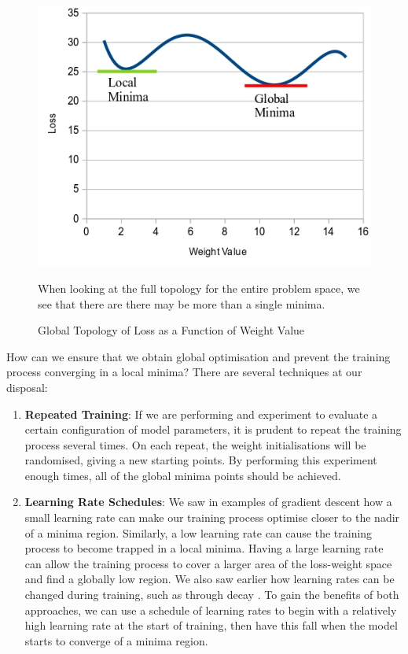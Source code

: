 \begin{figure}[h]
	\centering
	\includegraphics[scale=0.45]{Figures/loss_minima_maxima.jpg}
	\caption{Global Topology of Loss as a Function of Weight Value} {When looking at the full topology for the entire problem space, we see that there are there may be more than a single minima. }
	\label{fig:minima_maxima}
\end{figure}

\noindent
How can we ensure that we obtain global optimisation and prevent the training process converging in a local minima? There are several techniques at our disposal:

\begin{enumerate}
    \item \textbf{Repeated Training}: If we are performing and experiment to evaluate a certain configuration of model parameters, it is prudent to repeat the training process several times. On each repeat, the weight initialisations will be randomised, giving a new starting points. By performing this experiment enough times, all of the global minima points should be achieved.
    
    \item \textbf{Learning Rate Schedules}: We saw in examples of gradient descent how a small learning rate can make our training process optimise closer to the nadir of a minima region. Similarly, a low learning rate can cause the training process to become trapped in a local minima. Having a large learning rate can allow the training process to cover a larger area of the loss-weight space and find a globally low region. We also saw earlier how learning rates can be changed during training, such as through decay \cite{you2019does}. To gain the benefits of both approaches, we can use a schedule of learning rates \cite{xu2019learning} to begin with a relatively high learning rate at the start of training, then have this fall when the model starts to converge of a minima region.
    
\end{enumerate}

